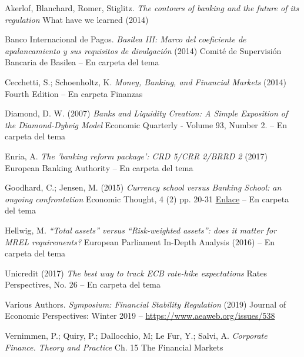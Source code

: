 \documentclass{nuevotema}
\begin{document}
Akerlof, Blanchard, Romer, Stiglitz. \textit{The contours of banking and the future of its regulation} What have we learned (2014)

Banco Internacional de Pagos. \textit{Basilea III: Marco del coeficiente de apalancamiento y sus requisitos de divulgación} (2014) Comité de Supervisión Bancaria de Basilea -- En carpeta del tema

Cecchetti, S.; Schoenholtz, K. \textit{Money, Banking, and Financial Markets} (2014) Fourth Edition -- En carpeta Finanzas

Diamond, D. W. (2007) \textit{Banks and Liquidity Creation: A Simple Exposition of the Diamond-Dybvig Model} Economic Quarterly - Volume 93, Number 2. -- En carpeta del tema 

Enria, A. \textit{The 'banking reform package': CRD 5/CRR 2/BRRD 2} (2017) European Banking Authority -- En carpeta del tema

Goodhard, C.; Jensen, M. (2015) \textit{Currency school versus Banking School: an ongoing confrontation} Economic Thought, 4 (2) pp. 20-31 \href{http://eprints.lse.ac.uk/64068/1/Currency\%20School\%20versus\%20Banking\%20School.pdf}{Enlace} -- En carpeta del tema

Hellwig, M. \textit{``Total assets'' versus ``Risk-weighted assets'': does it matter for MREL requirements?} European Parliament In-Depth Analysis (2016) -- En carpeta del tema

Unicredit (2017) \textit{The best way to track ECB rate-hike expectations} Rates Perspectives, No. 26 -- En carpeta del tema

Various Authors. \textit{Symposium: Financial Stability Regulation} (2019) Journal of Economic Perspectives: Winter 2019 -- \url{https://www.aeaweb.org/issues/538} 

Vernimmen, P.; Quiry, P.; Dallocchio, M; Le Fur, Y.; Salvi, A. \textit{Corporate Finance. Theory and Practice} Ch. 15 The Financial Markets
\end{document}
